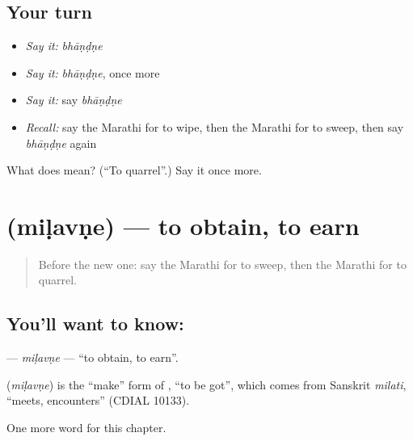 \subsection*{Your turn}
\begin{itemize}
\raggedright
  \item \emph{Say it:} \emph{bhāṇḍṇe}
  \item \emph{Say it:} \emph{bhāṇḍṇe}, once more
  \item \emph{Say it:} say \emph{bhāṇḍṇe}
  \item \emph{Recall:} say the Marathi for to wipe, then the Marathi for to sweep, then say \emph{bhāṇḍṇe} again
\end{itemize}

\begin{tcolorbox}[breakable,colback=teal!4,colframe=teal!35!black,title={Before you move on}]
What does  mean? (\textquotedblleft{}To quarrel\textquotedblright{}.) Say it once more.
\end{tcolorbox}
\section[\texorpdfstring{\mr{मिळवणे} (miḷavṇe)}{मिळवणे (miḷavṇe)}]{ (miḷavṇe) — to obtain, to earn}

\label{lesson:MR-C158-milavne}



\begin{quote}
Before the new one: say the Marathi for to sweep, then the Marathi for to quarrel.
\end{quote}

\subsection*{You'll want to know: }
\textbf{} — \emph{miḷavṇe} — \textquotedblleft{}to obtain, to earn\textquotedblright{}.

\begin{cousinweb}
\textbf{} (\emph{miḷavṇe}) is the \textquotedblleft{}make\textquotedblright{} form of \textbf{}, \textquotedblleft{}to be got\textquotedblright{}, which comes from Sanskrit \emph{milati}, \textquotedblleft{}meets, encounters\textquotedblright{} (CDIAL 10133).
\end{cousinweb}

\begin{grammarlens}[title={What you've built}]
One more word for this chapter.
\end{grammarlens}

